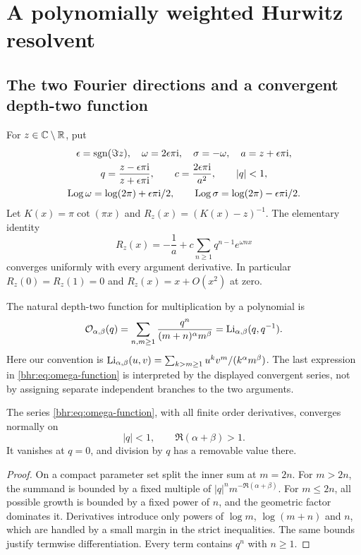 \section{A polynomially weighted Hurwitz resolvent}
\label{bhr:sec:weighted}

\subsection{The two Fourier directions and a convergent depth-two function}

For $z\in\mathbb C\setminus\mathbb R$, put
\begin{equation}\label{bhr:eq:coordinates}
 \begin{gathered}
 \epsilon=\operatorname{sgn}(\Im z),\quad \omega=2\epsilon\pi\mathrm i,
 \quad \sigma=-\omega,\quad a=z+\epsilon\pi\mathrm i,\\
 q=\frac{z-\epsilon\pi\mathrm i}{z+\epsilon\pi\mathrm i},\qquad
 c=\frac{2\epsilon\pi\mathrm i}{a^2},\qquad |q|<1,\\
 \operatorname{Log}\omega=\log(2\pi)+\epsilon\pi\mathrm i/2,\qquad
 \operatorname{Log}\sigma=\log(2\pi)-\epsilon\pi\mathrm i/2.
 \end{gathered}
\end{equation}
Let $K(x)=\pi\cot(\pi x)$ and $R_z(x)=(K(x)-z)^{-1}$.
The elementary identity
\begin{equation}\label{bhr:eq:resolvent-fourier}
 R_z(x)=-\frac1a+c\sum_{n\ge1}q^{n-1}e^{\omega nx}
\end{equation}
converges uniformly with every argument derivative. In particular
$R_z(0)=R_z(1)=0$ and $R_z(x)=x+O(x^2)$ at zero.

The natural depth-two function for multiplication by a polynomial is
\begin{equation}\label{bhr:eq:omega-function}
 \mathcal O_{\alpha,\beta}(q)
   =\sum_{n,m\ge1}\frac{q^n}{(m+n)^\alpha m^\beta}
   =\operatorname{Li}_{\alpha,\beta}(q,q^{-1}).
\end{equation}
Here our convention is
$\operatorname{Li}_{\alpha,\beta}(u,v)=\sum_{k>m\ge1}
u^kv^m/(k^\alpha m^\beta)$.
The last expression in \eqref{bhr:eq:omega-function} is interpreted by
the displayed convergent series, not by assigning separate
independent branches to the two arguments.

\begin{lemma}\label{bhr:lem:omega-normal}
The series \eqref{bhr:eq:omega-function}, with all finite order
derivatives, converges normally on
\[
 |q|<1,\qquad \Re(\alpha+\beta)>1.
\]
It vanishes at $q=0$, and division by $q$ has a removable value there.
\end{lemma}
\begin{proof}
On a compact parameter set split the inner sum at $m=2n$.
For $m>2n$, the summand is bounded by a fixed multiple of
$|q|^n m^{-\Re(\alpha+\beta)}$. For $m\le2n$, all possible
growth is bounded by a fixed power of $n$, and the geometric
factor dominates it. Derivatives introduce only powers of
$\log m$, $\log(m+n)$ and $n$, which are handled by a small
margin in the strict inequalities. The same bounds justify
termwise differentiation. Every term contains $q^n$ with $n\ge1$.
\end{proof}

